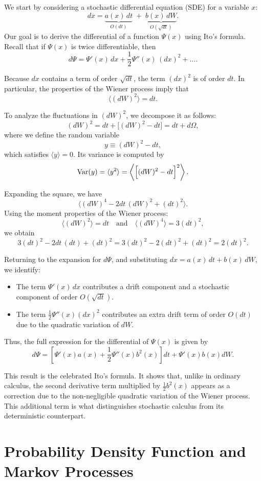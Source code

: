 We start by considering a stochastic differential equation (SDE) for a variable $x$:
$$
dx = \underbrace{a(x)\,dt}_{O(dt)} \;+\; \underbrace{b(x)\,dW}_{O(\sqrt{dt})}.
$$
Our goal is to derive the differential of a function $\Psi(x)$ using Ito's formula. Recall that if $\Psi(x)$ is twice differentiable, then
$$
d\Psi = \Psi'(x)\,dx + \frac{1}{2}\Psi''(x)\,(dx)^2 + \dots.
$$

Because $dx$ contains a term of order $\sqrt{dt}$, the term $(dx)^2$ is of order $dt$. In particular, the properties of the Wiener process imply that
$$
\boxed{\langle (dW)^2 \rangle = dt}.
$$

To analyze the fluctuations in $(dW)^2$, we decompose it as follows:
$$
(dW)^2 = dt + \bigl[(dW)^2 - dt\bigr] = dt + d\Omega,
$$
where we define the random variable
$$
y \equiv (dW)^2 - dt,
$$
which satisfies $\langle y \rangle = 0$. Its variance is computed by
$$
\text{Var}(y) = \langle y^2 \rangle = \left\langle \Bigl[(dW)^2 - dt\Bigr]^2 \right\rangle.
$$

Expanding the square, we have
$$
\langle (dW)^4 - 2dt\,(dW)^2 + (dt)^2 \rangle.
$$
Using the moment properties of the Wiener process:
\[
\langle (dW)^2 \rangle = dt \quad \text{and} \quad \langle (dW)^4 \rangle = 3(dt)^2,
\]
we obtain
$$
3(dt)^2 - 2dt\,(dt) + (dt)^2 = 3(dt)^2 - 2(dt)^2 + (dt)^2 = 2(dt)^2.
$$

Returning to the expansion for $d\Psi$, and substituting $dx = a(x)\,dt + b(x)\,dW$, we identify:
\begin{itemize}
    \item The term $\Psi'(x)\,dx$ contributes a drift component and a stochastic component of order $O(\sqrt{dt})$.
    \item The term $\frac{1}{2}\Psi''(x)(dx)^2$ contributes an extra drift term of order $O(dt)$ due to the quadratic variation of $dW$.
\end{itemize}

Thus, the full expression for the differential of $\Psi(x)$ is given by
$$
d\Psi = \left[\Psi'(x)a(x) + \frac{1}{2}\Psi''(x)b^2(x)\right]dt + \Psi'(x)b(x)dW.
$$

This result is the celebrated Ito's formula. It shows that, unlike in ordinary calculus, the second derivative term multiplied by $\frac{1}{2}b^2(x)$ appears as a correction due to the non-negligible quadratic variation of the Wiener process. This additional term is what distinguishes stochastic calculus from its deterministic counterpart.

\section{Probability Density Function and Markov Processes}

